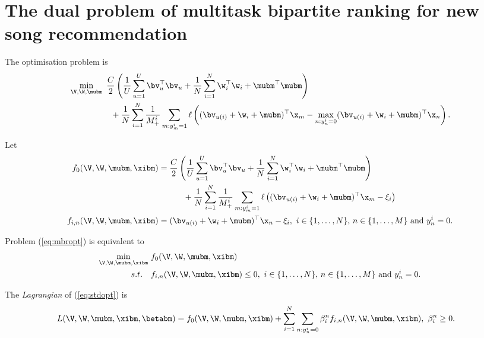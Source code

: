 \section{The dual problem of multitask bipartite ranking for new song recommendation}

The optimisation problem is
\begin{equation}
\label{eq:mbropt}
\begin{aligned}
&\min_{\V, \W, \mubm} \ \frac{C}{2} \left( \frac{1}{U} \sum_{u=1}^U \bv_u^\top \bv_u 
     + \frac{1}{N} \sum_{i=1}^N \w_i^\top \w_i + \mubm^\top \mubm \right) \\
& \hspace{5em}
     + \frac{1}{N} \sum_{i=1}^N \frac{1}{M_+^i} \sum_{m: y_m^i = 1} \ell \left( (\bv_{u(i)} + \w_i + \mubm)^\top \x_m 
     - \max_{n: y_n^i = 0} (\bv_{u(i)} + \w_i + \mubm)^\top \x_n \right).
\end{aligned}
\end{equation}

Let 
\begin{equation*}
\begin{aligned}
f_0(\V, \W, \mubm, \xibm) &= \frac{C}{2} \left( \frac{1}{U} \sum_{u=1}^U \bv_u^\top \bv_u 
     + \frac{1}{N} \sum_{i=1}^N \w_i^\top \w_i + \mubm^\top \mubm \right) \\
& \hspace{3em}
     + \frac{1}{N} \sum_{i=1}^N \frac{1}{M_+^i} \sum_{m: y_m^i = 1} 
       \ell \left( (\bv_{u(i)} + \w_i + \mubm)^\top \x_m - \xi_i \right) \\
f_{i,n} (\V, \W, \mubm, \xibm) &= (\bv_{u(i)} + \w_i + \mubm)^\top \x_n - \xi_i, \
i \in \{1,\dots,N\}, \, n \in \{1,\dots,M\} \ \mathrm{and} \ y_n^i = 0.
\end{aligned}
\end{equation*}

Problem (\ref{eq:mbropt}) is equivalent to 
\begin{equation}
\label{eq:stdopt}
\begin{aligned}
\min_{\V, \W, \mubm, \xibm} \ & f_0(\V, \W, \mubm, \xibm) \\
s.t. \quad & f_{i,n}(\V, \W, \mubm, \xibm) \le 0, \
i \in \{1,\dots,N\}, \, n \in \{1,\dots,M\} \ \mathrm{and} \ y_n^i = 0.
\end{aligned}
\end{equation}

The \emph{Lagrangian} of (\ref{eq:stdopt}) is
\begin{equation*}
\begin{aligned}
L(\V, \W, \mubm, \xibm, \betabm) 
&= f_0(\V, \W, \mubm, \xibm) + \sum_{i=1}^N \sum_{n: y_n^i = 0} \beta_i^n f_{i,n} (\V, \W, \mubm, \xibm), \
\beta_i^n \ge 0.
\end{aligned}
\end{equation*}

